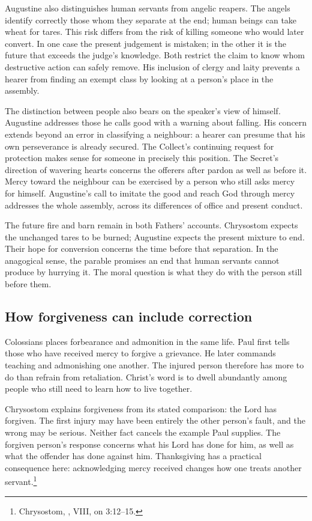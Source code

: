 Augustine also distinguishes human servants from angelic reapers.
The angels identify correctly those whom they separate at the end;
human beings can take wheat for tares. This risk differs from the
risk of killing someone who would later convert. In one case the
present judgement is mistaken; in the other it is the future that
exceeds the judge's knowledge. Both restrict the claim to know whom
destructive action can safely remove. His inclusion of clergy and
laity prevents a hearer from finding an exempt class by looking at
a person's place in the assembly.

The distinction between people also bears on the speaker's view of
himself. Augustine addresses those he calls good with a warning about
falling. His concern extends beyond an error in classifying a neighbour:
a hearer can presume that his own perseverance is already secured.
The Collect's continuing request for protection makes sense for someone
in precisely this position. The Secret's direction of wavering hearts
concerns the offerers after pardon as well as before it. Mercy toward
the neighbour can be exercised by a person who still asks mercy for
himself. Augustine's call to imitate the good and reach God through
mercy addresses the whole assembly, across its differences of office
and present conduct.

The future fire and barn remain in both Fathers' accounts. Chrysostom
expects the unchanged tares to be burned; Augustine expects the
present mixture to end. Their hope for conversion concerns the time
before that separation. In the anagogical sense, the parable promises
an end that human servants cannot produce by hurrying it. The moral
question is what they do with the person still before them.

\subsection{How forgiveness can include correction}
Colossians places forbearance and admonition in the same life. Paul
first tells those who have received mercy to forgive a grievance.
He later commands teaching and admonishing one another. The injured
person therefore has more to do than refrain from retaliation.
Christ's word is to dwell abundantly among people who still need
to learn how to live together.

Chrysostom explains forgiveness from its stated comparison: the Lord
has forgiven. The first injury may have been entirely the other
person's fault, and the wrong may be serious. Neither fact cancels
the example Paul supplies. The forgiven person's response concerns
what his Lord has done for him, as well as what the offender has
done against him. Thanksgiving has a practical consequence here:
acknowledging mercy received changes how one treats another
servant.\footnote{Chrysostom, , VIII,
on 3:12--15.}

